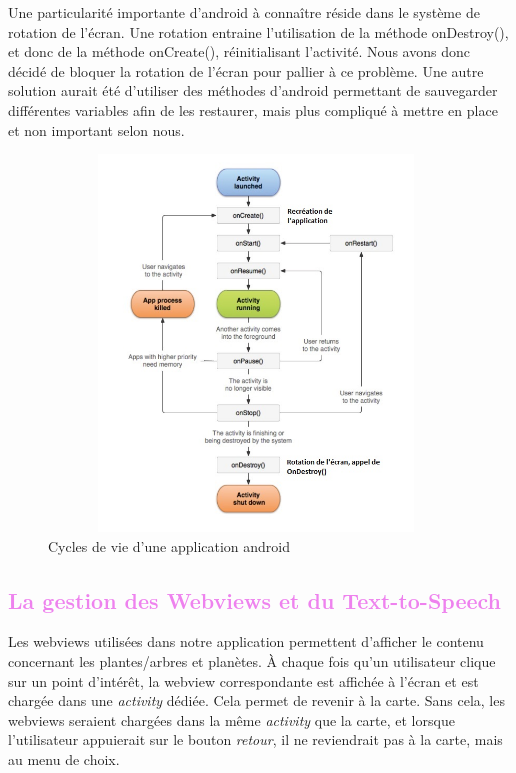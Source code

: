 \documentclass[a4paper,11pt]{article}
\begin{document}
		Une particularité importante d'android à connaître réside dans le système de rotation de l'écran. Une rotation entraine l'utilisation de la méthode onDestroy(), et donc de la méthode onCreate(), réinitialisant l'activité. Nous avons donc décidé de bloquer la rotation de l'écran pour pallier à ce problème. Une autre solution aurait été d'utiliser des méthodes d'android permettant de sauvegarder différentes variables afin de les restaurer, mais plus compliqué à mettre en place et non important selon nous.
		
		 \begin{figure}[H]
     \begin{center}
      \includegraphics[width=11cm,height=10cm]{cyclerotation.jpg}
      \caption{Cycles de vie d'une application android}
     \end{center}
    \end{figure}
		\textcolor{Violet}{\section{La gestion des Webviews et du Text-to-Speech}}
		Les webviews utilisées dans notre application permettent d'afficher le contenu concernant les plantes/arbres et planètes. À chaque fois qu'un utilisateur clique sur un point d'intérêt, la webview correspondante est affichée à l'écran et est chargée dans une \emph{activity} dédiée. Cela permet de revenir à la carte. Sans cela, les webviews seraient chargées dans la même \emph{activity} que la carte, et lorsque l'utilisateur appuierait sur le bouton \emph{retour}, il ne reviendrait pas à la carte, mais au menu de choix.
		
\end{document}

